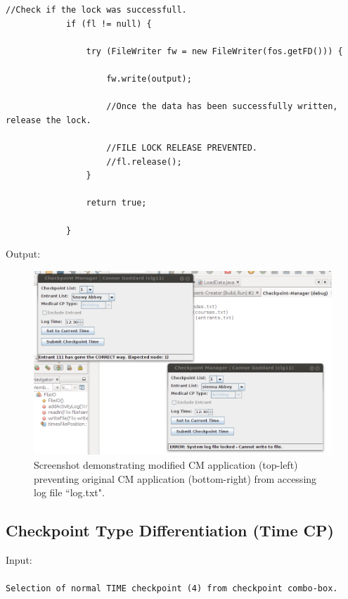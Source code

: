 \documentclass[a4paper, 10pt]{article}
\begin{document}
\begin{lstlisting}[style=customjava, caption=File export code modified to prevent a file lock being released once accessed.]
  //Check if the lock was successfull.
            if (fl != null) {

                try (FileWriter fw = new FileWriter(fos.getFD())) {

                    fw.write(output);

                    //Once the data has been successfully written, release the lock.
                    
                    //FILE LOCK RELEASE PREVENTED.
                    //fl.release();
                }

                return true;

            }

\end{lstlisting}

Output:
\begin{figure}[ht!]
\centering
\includegraphics[scale=0.65]{cm-filelock.png}
\caption{Screenshot demonstrating modified CM application (top-left) preventing original CM application (bottom-right) from accessing log file ``log.txt".}
\end{figure}

\clearpage
\subsection{Checkpoint Type Differentiation (Time CP)}

Input: \\\\
\verb+Selection of normal TIME checkpoint (4) from checkpoint combo-box.+\\
\end{document}
